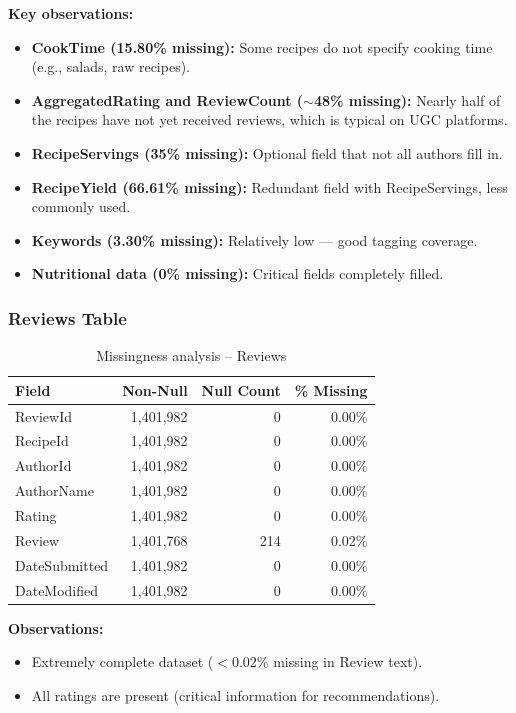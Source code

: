 \documentclass[11pt,a4paper]{article}
\begin{document}
\textbf{Key observations:}

\begin{itemize}
    \item \textbf{CookTime (15.80\% missing):} Some recipes do not specify cooking time (e.g., salads, raw recipes).

    \item \textbf{AggregatedRating and ReviewCount ($\sim$48\% missing):} Nearly half of the recipes have not yet received reviews, which is typical on UGC platforms.

    \item \textbf{RecipeServings (35\% missing):} Optional field that not all authors fill in.

    \item \textbf{RecipeYield (66.61\% missing):} Redundant field with RecipeServings, less commonly used.

    \item \textbf{Keywords (3.30\% missing):} Relatively low --- good tagging coverage.

    \item \textbf{Nutritional data (0\% missing):} Critical fields completely filled.
\end{itemize}

\subsubsection{Reviews Table}

\begin{table}[H]
\centering
\begin{tabular}{lrrr}
\toprule
\textbf{Field} & \textbf{Non-Null} & \textbf{Null Count} & \textbf{\% Missing} \\
\midrule
ReviewId & 1,401,982 & 0 & 0.00\% \\
RecipeId & 1,401,982 & 0 & 0.00\% \\
AuthorId & 1,401,982 & 0 & 0.00\% \\
AuthorName & 1,401,982 & 0 & 0.00\% \\
Rating & 1,401,982 & 0 & 0.00\% \\
Review & 1,401,768 & 214 & 0.02\% \\
DateSubmitted & 1,401,982 & 0 & 0.00\% \\
DateModified & 1,401,982 & 0 & 0.00\% \\
\bottomrule
\end{tabular}
\caption{Missingness analysis -- Reviews}
\label{tab:missing_reviews}
\end{table}
\textbf{Observations:}
\begin{itemize}
    \item Extremely complete dataset ($<$0.02\% missing in Review text).
    \item All ratings are present (critical information for recommendations).
\end{itemize}
\end{document}
